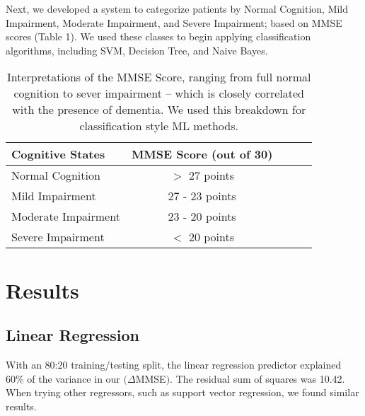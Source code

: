 \documentclass{article}
\begin{document}
Next, we developed a system to categorize patients by Normal Cognition, Mild Impairment, Moderate Impairment, and Severe Impairment; based on MMSE scores (Table 1). We used these classes to begin applying classification algorithms, including SVM, Decision Tree, and Naive Bayes. 

\begin{flushleft}
\begin{table}[h]
\caption{Interpretations of the MMSE Score, ranging from full normal cognition to sever impairment -- which is closely correlated with the presence of dementia. We used this breakdown for classification style ML methods.}
\label{sample-table}
\vskip 0.15in
\begin{center}
\begin{small}
\begin{sc}
\begin{tabular}{lcccr}
\hline
\abovespace
\belowspace
Cognitive States & MMSE Score (out of 30) \\
\hline
\abovespace
\belowspace
Normal Cognition    & $>$ 27 points \\
\belowspace
Mild Impairment & 27 - 23 points  \\
\belowspace
Moderate Impairment    &  23 - 20 points  \\
\belowspace

Severe Impairment     &  $<$ 20 points  \\

\hline
\end{tabular}
\end{sc}
\end{small}
\end{center}
\vskip -0.1in
\end{table}

\end{flushleft}

\section{Results}


\subsection{Linear Regression}
With an 80:20 training/testing split, the linear regression predictor explained 60\% of the variance in our $(\Delta$MMSE$)$. The residual sum of squares was 10.42. When trying other regressors, such as  support vector regression, we found similar results.
\end{document}
